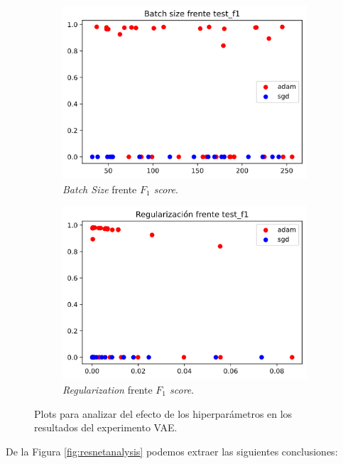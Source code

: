 \begin{figure}[H]
\begin{subfigure}[b]{.5\textwidth}
  \centering
  \includegraphics[width=.8\linewidth]{imagenes/06_Experimentacion/vae/vaebs.png}
  \caption{\textit{Batch Size} frente \textit{$F_1$ score}.}
  \label{fig:vaebs}
\end{subfigure}
\begin{subfigure}[b]{.5\textwidth}
  \centering
  \includegraphics[width=.8\linewidth]{imagenes/06_Experimentacion/vae/vaereg.png}
  \caption{\textit{Regularization} frente \textit{$F_1$ score}.}
  \label{fig:vaereg}
\end{subfigure}

\caption{Plots para analizar del efecto de los hiperparámetros en los resultados del experimento VAE.}
\label{fig:vaeanalysis}
\end{figure}

De la Figura \ref{fig:resnetanalysis} podemos extraer las siguientes conclusiones:

